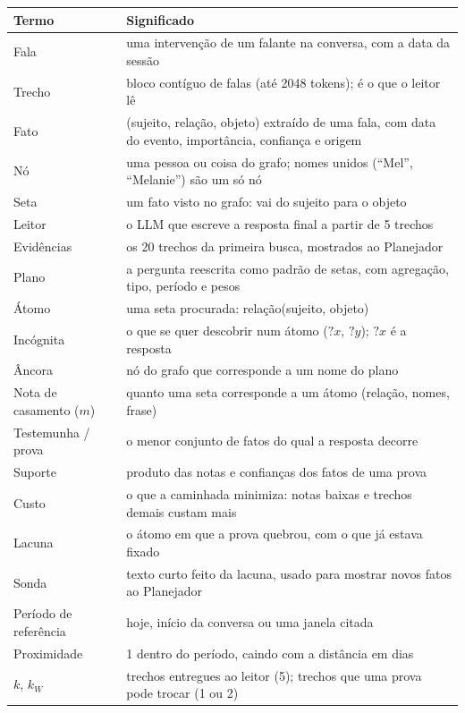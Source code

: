 \documentclass[11pt]{article}
\newcommand{\rel}[1]{\textsf{#1}}
\newcommand{\V}[1]{\mathord{?}\mathit{#1}}
\begin{document}
\begin{center}\small
\begin{tabularx}{\textwidth}{@{}l Y@{}}
\toprule
Termo & Significado \\
\midrule
Fala & uma intervenção de um falante na conversa, com a data da sessão \\
Trecho & bloco contíguo de falas (até 2048 tokens); é o que o leitor lê \\
Fato & (sujeito, relação, objeto) extraído de uma fala, com data do evento, importância, confiança e origem \\
Nó & uma pessoa ou coisa do grafo; nomes unidos (``Mel'', ``Melanie'') são um só nó \\
Seta & um fato visto no grafo: vai do sujeito para o objeto \\
Leitor & o LLM que escreve a resposta final a partir de 5 trechos \\
Evidências & os 20 trechos da primeira busca, mostrados ao Planejador \\
Plano & a pergunta reescrita como padrão de setas, com agregação, tipo, período e pesos \\
Átomo & uma seta procurada: \rel{relação}(sujeito, objeto) \\
Incógnita & o que se quer descobrir num átomo ($\V x$, $\V y$); $\V x$ é a resposta \\
Âncora & nó do grafo que corresponde a um nome do plano \\
Nota de casamento ($m$) & quanto uma seta corresponde a um átomo (relação, nomes, frase) \\
Testemunha / prova & o menor conjunto de fatos do qual a resposta decorre \\
Suporte & produto das notas e confianças dos fatos de uma prova \\
Custo & o que a caminhada minimiza: notas baixas e trechos demais custam mais \\
Lacuna & o átomo em que a prova quebrou, com o que já estava fixado \\
Sonda & texto curto feito da lacuna, usado para mostrar novos fatos ao Planejador \\
Período de referência & hoje, início da conversa ou uma janela citada \\
Proximidade & 1 dentro do período, caindo com a distância em dias \\
$k$, $k_W$ & trechos entregues ao leitor (5); trechos que uma prova pode trocar (1 ou 2) \\
\bottomrule
\end{tabularx}
\end{center}
\end{document}
